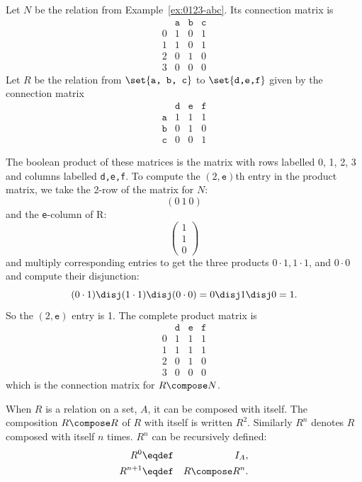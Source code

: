 \begin{example}
Let $N$ be the relation from Example~\ref{ex:0123-abc}.  Its connection
matrix is
\[\begin{array}{r|ccc}
& \texttt{a}&  \texttt{b}&  \texttt{c}\\
\hline  
0& 1&  0&  1\\
1& 1&  0&  1\\
2& 0&  1&  0\\
3& 0&  0&  0
\end{array}
\]
Let $R$ be the relation from $\set{\texttt{a, b, c}}$ to
$\set{\texttt{d,e,f}}$ given by the connection matrix
\[\begin{array}{r|ccc}
& \texttt{d}&  \texttt{e}&  \texttt{f}\\
\hline  
\texttt{a}& 1&  1&  1\\
\texttt{b}& 0&  1&  0\\
\texttt{c}& 0&  0&  1
\end{array}
\]

The boolean product of these matrices is the matrix with rows labelled 0,
1, 2, 3 and columns labelled \texttt{d,e,f}.  To compute the
$(2,\texttt{e})$th entry in the product matrix, we take the 2-row of the
matrix for $N$:
\[
(0\ 1\  0)
\]
and the \texttt{e}-column of R:
\[
\left(\begin{array}{c}
1\\
1\\
0
\end{array}\right)
\]
and multiply corresponding entries to get the three products $0\cdot1, 1
\cdot 1$, and $0 \cdot 0$ and compute their disjunction:
\[
(0\cdot1) \disj (1 \cdot 1) \disj (0 \cdot 0) = 0 \disj 1 \disj 0 = 1.
\]
So the $(2,\texttt{e})$ entry is 1.  The complete product matrix is
\[\begin{array}{r|ccc}
& \texttt{d} &  \texttt{e} &  \texttt{f} \\
\hline  
0& 1&  1&  1\\
1& 1&  1&  1\\
2& 0&  1&  0\\
3& 0&  0&  0
\end{array}
\]
which is the connection matrix for $R \compose N$.
\end{example}

When $R$ is a relation on a set, $A$, it can be composed with itself.  The
composition $R \compose R$ of $R$ with itself is written $R^2$.  Similarly
$R^n$ denotes $R$ composed with itself $n$ times.  $R^n$ can be
recursively defined:
\begin{eqnarray*}
R^0 & \eqdef & I_A,\\
R^{n+1} & \eqdef & R \compose R^{n}.
\end{eqnarray*}


